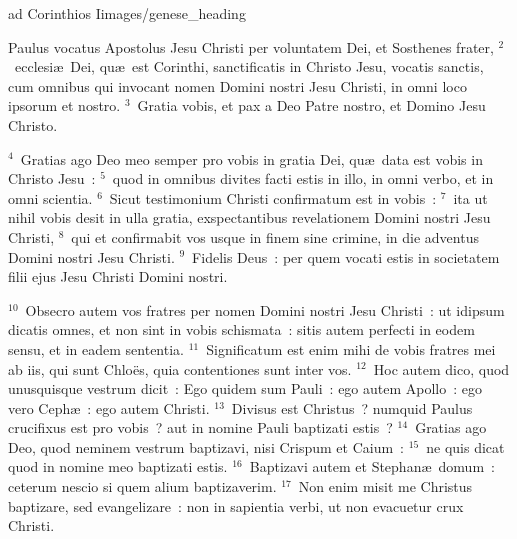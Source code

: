 {ad Corinthios I}{images/genese_heading}


\lettrine[lines=10,image=true,loversize=0.05,lraise=-0.03]{P}{}aulus vocatus Apostolus Jesu Christi per voluntatem Dei, et Sosthenes frater,
${}^{2}$~ecclesi\ae\ Dei, qu\ae\ est Corinthi, sanctificatis in Christo Jesu, vocatis sanctis, cum omnibus qui invocant nomen Domini nostri Jesu Christi, in omni loco ipsorum et nostro.
${}^{3}$~Gratia vobis, et pax a Deo Patre nostro, et Domino Jesu Christo.


${}^{4}$~Gratias ago Deo meo semper pro vobis in gratia Dei, qu\ae\ data est vobis in Christo Jesu~:
${}^{5}$~quod in omnibus divites facti estis in illo, in omni verbo, et in omni scientia.
${}^{6}$~Sicut testimonium Christi confirmatum est in vobis~:
${}^{7}$~ita ut nihil vobis desit in ulla gratia, exspectantibus revelationem Domini nostri Jesu Christi,
${}^{8}$~qui et confirmabit vos usque in finem sine crimine, in die adventus Domini nostri Jesu Christi.
${}^{9}$~Fidelis Deus~: per quem vocati estis in societatem filii ejus Jesu Christi Domini nostri.


${}^{10}$~Obsecro autem vos fratres per nomen Domini nostri Jesu Christi~: ut idipsum dicatis omnes, et non sint in vobis schismata~: sitis autem perfecti in eodem sensu, et in eadem sententia.
${}^{11}$~Significatum est enim mihi de vobis fratres mei ab iis, qui sunt Chlo\"es, quia contentiones sunt inter vos.
${}^{12}$~Hoc autem dico, quod unusquisque vestrum dicit~: Ego quidem sum Pauli~: ego autem Apollo~: ego vero Ceph\ae~: ego autem Christi.
${}^{13}$~Divisus est Christus~? numquid Paulus crucifixus est pro vobis~? aut in nomine Pauli baptizati estis~?
${}^{14}$~Gratias ago Deo, quod neminem vestrum baptizavi, nisi Crispum et Caium~:
${}^{15}$~ne quis dicat quod in nomine meo baptizati estis.
${}^{16}$~Baptizavi autem et Stephan\ae\ domum~: ceterum nescio si quem alium baptizaverim.
${}^{17}$~Non enim misit me Christus baptizare, sed evangelizare~: non in sapientia verbi, ut non evacuetur crux Christi.


